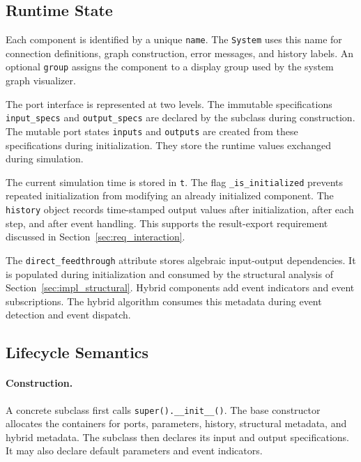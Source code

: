 \subsection{Runtime State}

Each component is identified by a unique \texttt{name}.
The \texttt{System} uses this name for connection definitions, graph construction, error messages, and history labels.
An optional \texttt{group} assigns the component to a display group used by the system graph visualizer.

The port interface is represented at two levels.
The immutable specifications \texttt{input\_specs} and \texttt{output\_specs} are declared by the subclass during construction.
The mutable port states \texttt{inputs} and \texttt{outputs} are created from these specifications during initialization.
They store the runtime values exchanged during simulation.

The current simulation time is stored in \texttt{t}.
The flag \texttt{\_is\_initialized} prevents repeated initialization from modifying an already initialized component.
The \texttt{history} object records time-stamped output values after initialization, after each step, and after event handling.
This supports the result-export requirement discussed in Section~\ref{sec:req_interaction}.

The \texttt{direct\_feedthrough} attribute stores algebraic input-output dependencies.
It is populated during initialization and consumed by the structural analysis of Section~\ref{sec:impl_structural}.
Hybrid components add event indicators and event subscriptions.
The hybrid algorithm consumes this metadata during event detection and event dispatch.

\subsection{Lifecycle Semantics}

\paragraph{Construction.}
A concrete subclass first calls \texttt{super().\_\_init\_\_()}.
The base constructor allocates the containers for ports, parameters, history, structural metadata, and hybrid metadata.
The subclass then declares its input and output specifications.
It may also declare default parameters and event indicators.

